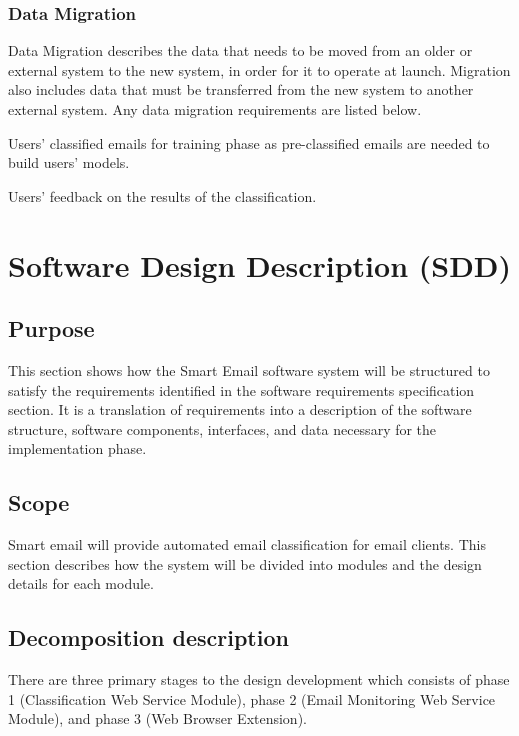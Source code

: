 \subsubsection{Data Migration}
Data Migration describes the data that needs to be moved from an older or external 
system to the new system, in order for it to operate at launch. Migration also includes 
data that must be transferred from the new system to another external system. 
Any data migration requirements are listed below.

\begin{my_enumerate}
  \item Users' classified emails for training phase as pre-classified emails are needed to build users' models.
  \item Users' feedback on the results of the classification.
\end{my_enumerate}


\section{Software Design Description (SDD)}
\label{sec:4_SDD}

\subsection{Purpose}
This section shows how the Smart Email software system will be 
structured to satisfy the requirements identified in the software
requirements specification section. It is a translation of 
requirements into a description of the software structure, software components, 
interfaces, and data necessary for the implementation phase.

\subsection{Scope}
Smart email will provide automated email classification for email clients. 
This section describes how the system will be divided into modules and 
the design details for each module.


\subsection{Decomposition description}
There are three primary stages to the design development which consists of phase 1 
(Classification Web Service Module), phase 2 (Email Monitoring Web Service Module),
and phase 3 (Web Browser Extension).

